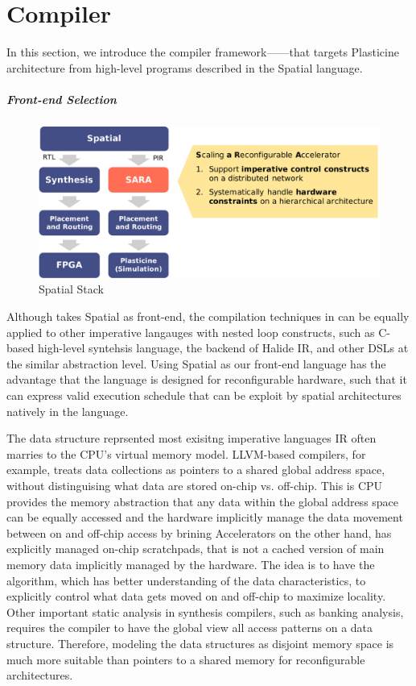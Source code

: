 \chapter{Compiler} \label{sec:compiler}

In this section, we introduce the compiler framework---\name---that targets Plasticine
architecture from high-level programs described in the Spatial language. 

\paragraph{Front-end Selection} 

\begin{figure}
\centering
\includegraphics[width=1\textwidth]{figs/spatialstack.pdf}
\caption[Spatial Stack]{Spatial Stack}
\label{fig:spatialstack}
\end{figure}

Although \name takes Spatial as front-end, the compilation techniques in \name can be equally
applied to other imperative langauges with nested loop constructs, such as C-based high-level
syntehsis language, the backend of Halide IR, and other DSLs at the similar abstraction level. 
Using Spatial as our front-end language has the advantage that the language is designed for
reconfigurable hardware, such that it can express valid execution schedule that can be exploit by
spatial architectures natively in the language.

The data structure reprsented most exisitng imperative languages IR often marries to the
CPU's virtual memory model. LLVM-based compilers, for example, treats data collections as pointers to a shared
global address space, without distinguising what data are stored on-chip vs. off-chip.
This is CPU provides the memory abstraction that any data within the global address space 
can be equally accessed and the hardware implicitly manage the data movement between on and off-chip 
access by brining
Accelerators on the other hand, has explicitly managed on-chip scratchpads, that is not a cached
version of main memory data implicitly managed by the hardware.
The idea is to have the algorithm, which has better understanding of the data characteristics, to
explicitly control what data gets moved on and off-chip to maximize locality.
Other important static analysis in synthesis compilers, such as banking analysis, requires the
compiler to have the global view all access patterns on a data structure.
Therefore, modeling the data structures as disjoint memory space is much more suitable 
than pointers to a shared memory for reconfigurable architectures.

